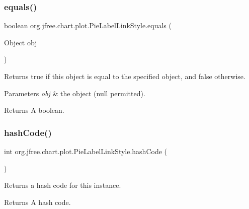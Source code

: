 \subsubsection{\texorpdfstring{equals()}{equals()}}
{\footnotesize\ttfamily boolean org.\+jfree.\+chart.\+plot.\+Pie\+Label\+Link\+Style.\+equals (\begin{DoxyParamCaption}\item[{Object}]{obj }\end{DoxyParamCaption})}

Returns {\ttfamily true} if this object is equal to the specified object, and {\ttfamily false} otherwise.


\begin{DoxyParams}{Parameters}
{\em obj} & the object ({\ttfamily null} permitted).\\
\hline
\end{DoxyParams}
\begin{DoxyReturn}{Returns}
A boolean. 
\end{DoxyReturn}
\mbox{\label{classorg_1_1jfree_1_1chart_1_1plot_1_1_pie_label_link_style_a8f338f8b0b7bd9be04044970bd8d912f}} 
\subsubsection{\texorpdfstring{hash\+Code()}{hashCode()}}
{\footnotesize\ttfamily int org.\+jfree.\+chart.\+plot.\+Pie\+Label\+Link\+Style.\+hash\+Code (\begin{DoxyParamCaption}{ }\end{DoxyParamCaption})}

Returns a hash code for this instance.

\begin{DoxyReturn}{Returns}
A hash code. 
\end{DoxyReturn}
\mbox{\label{classorg_1_1jfree_1_1chart_1_1plot_1_1_pie_label_link_style_a943bf1863e66cbd4bcfacfdee30dc3e9}} 
